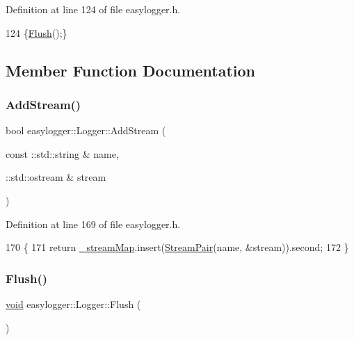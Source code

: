 Definition at line 124 of file easylogger.\+h.


\begin{DoxyCode}
124 \{\mbox{\hyperlink{classeasylogger_1_1_logger_ae5f1bdb76764e5cb673d27bead3f84b0}{Flush}}();\}
\end{DoxyCode}


\subsection{Member Function Documentation}
\mbox{\label{classeasylogger_1_1_logger_a12a61baa5ec56a9150a41104a34f0b05}} 
\subsubsection{\texorpdfstring{Add\+Stream()}{AddStream()}}
{\footnotesize\ttfamily bool easylogger\+::\+Logger\+::\+Add\+Stream (\begin{DoxyParamCaption}\item[{const \+::std\+::string \&}]{name,  }\item[{\+::std\+::ostream \&}]{stream }\end{DoxyParamCaption})\hspace{0.3cm}{\ttfamily [inline]}}



Definition at line 169 of file easylogger.\+h.


\begin{DoxyCode}
170         \{
171             \textcolor{keywordflow}{return} \mbox{\hyperlink{classeasylogger_1_1_logger_a9290bed24c12786abef2c421158268f8}{\_streamMap}}.insert(\mbox{\hyperlink{classeasylogger_1_1_logger_a8c37cd26d5210c8ede4cd355a6bceb95}{StreamPair}}(name, &stream)).second;
172         \}
\end{DoxyCode}
\mbox{\label{classeasylogger_1_1_logger_ae5f1bdb76764e5cb673d27bead3f84b0}} 
\subsubsection{\texorpdfstring{Flush()}{Flush()}}
{\footnotesize\ttfamily \mbox{\hyperlink{_thread_8h_af1e856da2e658414cb2456cb6f7ebc66}{void}} easylogger\+::\+Logger\+::\+Flush (\begin{DoxyParamCaption}{ }\end{DoxyParamCaption})\hspace{0.3cm}{\ttfamily [inline]}}



